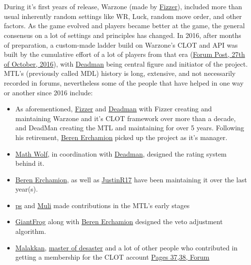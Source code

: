 \\
\\
During it's first years of release, Warzone (made by \href{https://www.warzone.com/Profile?p=62456969&u=Fizzer_1}{Fizzer}), included more than usual inherently random settings like WR, Luck, random move order, and other factors. As the game evolved and players became better at the game, the general consensus on a lot of settings and principles has changed. In 2016, after months of preparation, a custom-made ladder build on Warzone's CLOT and API was built by the cumulative effort of a lot of players from that era (\href{https://www.warzone.com/Forum/216823-multiday-ladder}{Forum Post, 27th of October, 2016}), with \href{https://www.warzone.com/Profile?p=2428496679&u=Deadman_4}{Deadman} being central figure and initiator of the project. MTL's (previously called MDL) history is long, extensive, and not necessarily recorded in forums, nevertheless some of the people that have helped in one way or another since 2016 include:
\begin{itemize}
    \item As aforementioned, \href{https://www.warzone.com/Profile?p=62456969&u=Fizzer_1}{Fizzer} and \href{https://www.warzone.com/Profile?p=2428496679&u=Deadman_4}{Deadman} with Fizzer creating and maintaining Warzone and it's CLOT framework over more than a decade, and DeadMan creating the MTL and maintaining for over 5 years. Following his retirement, \href{https://www.warzone.com/Profile?p=314032996&u=Beren%20Erchamion_1}{Beren Erchamion} picked up the project as it's manager.
    \item \href{https://www.warzone.com/Profile?p=253091943&u=Math%20Wolf_1}{Math Wolf}, in coordination with \href{https://www.warzone.com/Profile?p=2428496679&u=Deadman_4}{Deadman}, designed the rating system behind it.
    \item \href{https://www.warzone.com/Profile?p=314032996&u=Beren%20Erchamion_1}{Beren Erchamion}, as well as \href{https://www.warzone.com/Profile?p=1277277659&u=JustinR17_1}{JustinR17} have been maintaining it over the last year(s).
    \item \href{https://www.warzone.com/Profile?p=486201411&u=ps_1}{ps} and \href{https://www.warzone.com/Profile?p=2211733141&u=Muli_1}{Muli} made contributions in the MTL's early stages
    \item \href{https://www.warzone.com/Profile?p=1527785728&u=GiantFrog_1}{GiantFrog} along with \href{https://www.warzone.com/Profile?p=314032996&u=Beren%20Erchamion_1}{Beren Erchamion} designed the veto adjustment algorithm.
    \item \href{https://www.warzone.com/Profile?p=257509174&u=malakkan_1}{Malakkan}, \href{https://www.warzone.com/Profile?p=2214950915&u=master+of+desaster_1}{master of desaster} and a lot of other people who contributed in getting a membership for the CLOT account \href{https://www.warzone.com/Forum/216823-multiday-ladder?Offset=720}{Pages 37,38, Forum}
\end{itemize}

